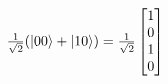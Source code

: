 \documentclass[preview]{standalone}
\begin{document}
\begin{center}
$\frac{1}{\sqrt{2}}(\ket{00} + \ket{10}) = \frac{1}{\sqrt{2}}\begin{bmatrix} 1 \\ 0 \\ 1 \\ 0 \end{bmatrix}$
\end{center}
\end{document}
